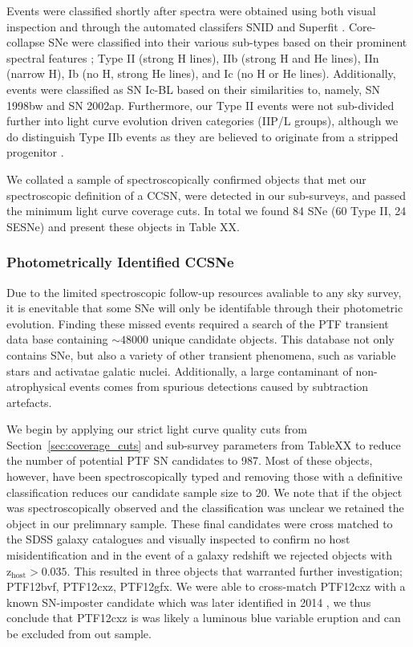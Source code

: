 \documentclass[a4paper,fleqn,usenatbib]{mnras}
\begin{document}
Events were classified shortly after spectra were obtained using both visual inspection and through the automated classifers SNID \citep{2007ApJ...666.1024B} and Superfit \citep{2005ApJ...634.1190H}. Core-collapse SNe were classified into their various sub-types based on their prominent spectral features \citep[for an overview see;][]{1997ARA&A..35..309F}; Type II (strong H lines), IIb (strong H and He lines), IIn (narrow H), Ib (no H, strong He lines), and Ic (no H or He lines). Additionally, events were classified as SN Ic-BL based on their similarities to, namely, SN 1998bw and SN 2002ap. Furthermore, our Type II events were not sub-divided further into light curve evolution driven categories (IIP/L groups), although we do distinguish Type IIb events as they are believed to originate from a stripped progenitor \citep[e.g.][]{2011ApJ...739...41C}.

We collated a sample of spectroscopically confirmed objects that met our spectroscopic definition of a CCSN, were detected in our sub-surveys, and passed the minimum light curve coverage cuts. In total we found 84 SNe (60 Type II, 24 SESNe) and present these objects in Table XX.


\subsubsection{Photometrically Identified CCSNe}
\label{sec:photCC}

Due to the limited spectroscopic follow-up resources avaliable to any sky survey, it is enevitable that some SNe will only be identifable through their photometric evolution. Finding these missed events required a search of the PTF transient data base containing $\sim 48 000$ unique candidate objects. This database not only contains SNe, but also a variety of other transient phenomena, such as variable stars and activatae galatic nuclei. Additionally, a large contaminant of non-atrophysical events comes from spurious detections caused by subtraction artefacts.

We begin by applying our strict light curve quality cuts from Section~\ref{sec:coverage_cuts} and sub-survey parameters from TableXX to reduce the number of potential PTF SN candidates to 987. Most of these objects, however, have been spectroscopically typed and removing those with a definitive classification reduces our candidate sample size to 20. We note that if the object was spectroscopically observed and the classification was unclear we retained the object in our prelimnary sample. These final candidates were cross matched to the SDSS galaxy catalogues and visually inspected to confirm no host misidentification \citep{Sullivan2006,Gupta2016} and in the event of a galaxy redshift we rejected objects with $\mathrm{z}_\mathrm{host}{>}0.035$. This resulted in three objects that warranted further investigation; PTF12bvf, PTF12cxz, PTF12gfx. We were able to cross-match PTF12cxz with a known SN-imposter candidate which was later identified in 2014 \citep{2014ATel.5737....1T}, we thus conclude that PTF12cxz is was likely a luminous blue variable eruption and can be excluded from out sample.
\end{document}

